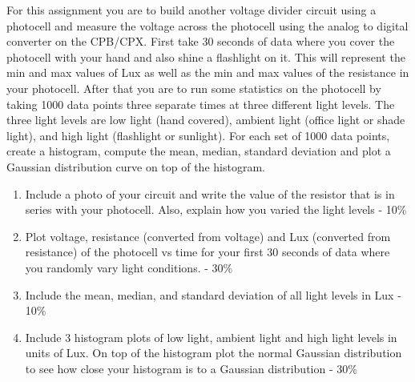 For this assignment you are to build another voltage divider circuit using a photocell and measure the voltage across the photocell using the analog to digital converter on the CPB/CPX. First take 30 seconds of data where you cover the photocell with your hand and also shine a flashlight on it. This will represent the min and max values of Lux as well as the min and max values of the resistance in your photocell. After that you are to run some statistics on the photocell by taking 1000 data points three separate times at three different light levels. The three light levels are low light (hand covered), ambient light (office light or shade light), and high light (flashlight or sunlight). For each set of 1000 data points, create a histogram, compute the mean, median, standard deviation and plot a Gaussian distribution curve on top of the histogram. 


        
\begin{enumerate}[itemsep=-5pt]
\item Include a photo of your circuit and write the value of the resistor that is in series with your photocell. Also, explain how you varied the light levels - 10\%
\item Plot voltage, resistance (converted from voltage) and Lux (converted from resistance) of the photocell vs time for your first 30 seconds of data where you randomly vary light conditions. - 30\%
\item Include the mean, median, and standard deviation of all light levels in Lux - 10\%
\item Include 3 histogram plots of low light, ambient light and high
light levels in units of Lux. On top of the histogram plot the normal Gaussian distribution to see how close your histogram is to a Gaussian distribution - 30\%
\end{enumerate}
